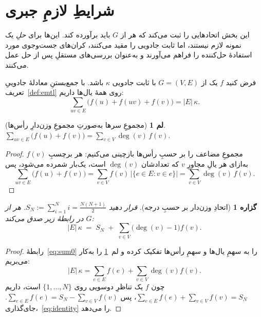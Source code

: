 \documentclass[11pt,a4paper]{article}
\newcommand{\en}[1]{\lr{{\enfont #1}}}
\newcommand{\km}{\kappa}
\DeclareMathOperator{\degr}{deg}
\theoremstyle{plain}
\newtheorem{proposition}{گزاره}
\newtheorem{lemma}{لم}
\theoremstyle{definition}
\theoremstyle{remark}
\begin{document}
\section{شرایطِ لازمِ جبری}\label{sec:algebra}

این بخش اتحادهایی را ثبت می‌کند که هر \en{EMTL} از $G$ باید برآورده کند. این‌ها برای
\emph{حلِ} یک نمونه لازم نیستند، اما ثابت جادویی را مقید می‌کنند، کران‌های جست‌وجوی
مورد استفادهٔ حل‌کننده را فراهم می‌آورند و به‌عنوان بررسی‌های مستقلِ پس از حل عمل
می‌کنند.

فرض کنید $f$ یک \en{EMTL} از $G=(V,E)$ با ثابت جادویی $\km$ باشد. با جمع‌بستنِ معادلهٔ
جادوییِ تعریف~\ref{def:emtl} روی همهٔ یال‌ها داریم:
\begin{equation}\label{eq:sum0}
  \sum_{uv\in E}\bigl(f(u)+f(uv)+f(v)\bigr) = |E|\,\km .
\end{equation}

\begin{lemma}[مجموعِ سرها به‌صورتِ مجموعِ وزن‌دارِ رأس‌ها]\label{lem:endpoint}
$\displaystyle \sum_{uv\in E}\bigl(f(u)+f(v)\bigr)=\sum_{v\in V}\degr(v)\,f(v).$
\end{lemma}

\begin{proof}
مجموعِ مضاعف را بر حسبِ رأس‌ها بازچینی می‌کنیم: هر برچسبِ $f(v)$ به‌ازای هر یالِ مجاورِ
$v$ که تعدادشان $\degr(v)$ است، یک‌بار شمرده می‌شود، پس
\[
  \sum_{uv\in E}\bigl(f(u)+f(v)\bigr)
   =\sum_{v\in V} f(v)\,\bigl|\{e\in E: v\in e\}\bigr|
   =\sum_{v\in V}\degr(v)\,f(v).
\]
\end{proof}

\begin{proposition}[اتحادِ وزن‌دار بر حسبِ درجه]\label{prop:identity}
قرار دهید $S_N:=\sum_{i=1}^{N} i=\tfrac{N(N+1)}{2}$. هر \en{EMTL} از $G$ در رابطهٔ زیر
صدق می‌کند:
\begin{equation}\label{eq:identity}
  |E|\,\km \;=\; S_N \;+\; \sum_{v\in V}\bigl(\degr(v)-1\bigr) f(v).
\end{equation}
\end{proposition}

\begin{proof}
رابطهٔ~\eqref{eq:sum0} را به سهمِ یال‌ها و سهمِ رأس‌ها تفکیک کرده و
لم~\ref{lem:endpoint} را به‌کار می‌بریم:
\[
  |E|\,\km=\sum_{e\in E}f(e)+\sum_{v\in V}\degr(v)f(v).
\]
چون $f$ یک تناظرِ دوسویی روی $\{1,\dots,N\}$ است، داریم
$\sum_{e\in E}f(e)+\sum_{v\in V}f(v)=S_N$، پس
$\sum_{e\in E}f(e)=S_N-\sum_{v\in V}f(v)$. جای‌گذاری،~\eqref{eq:identity} را می‌دهد.
\end{proof}
\end{document}
